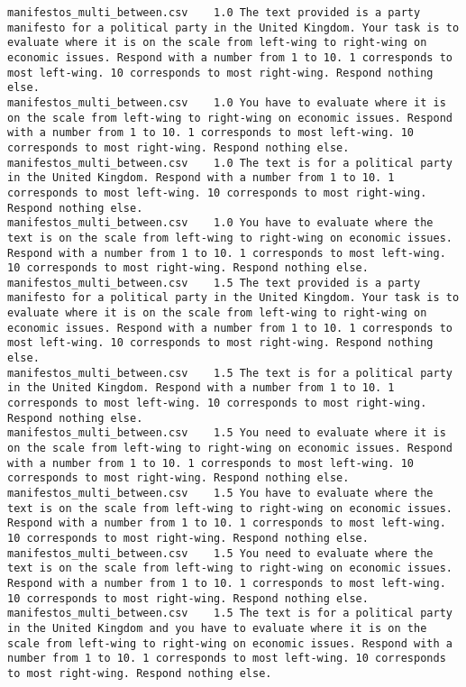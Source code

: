\begin{lstlisting}
manifestos_multi_between.csv	1.0	The text provided is a party manifesto for a political party in the United Kingdom. Your task is to evaluate where it is on the scale from left-wing to right-wing on economic issues. Respond with a number from 1 to 10. 1 corresponds to most left-wing. 10 corresponds to most right-wing. Respond nothing else.
manifestos_multi_between.csv	1.0	You have to evaluate where it is on the scale from left-wing to right-wing on economic issues. Respond with a number from 1 to 10. 1 corresponds to most left-wing. 10 corresponds to most right-wing. Respond nothing else.
manifestos_multi_between.csv	1.0	The text is for a political party in the United Kingdom. Respond with a number from 1 to 10. 1 corresponds to most left-wing. 10 corresponds to most right-wing. Respond nothing else.
manifestos_multi_between.csv	1.0	You have to evaluate where the text is on the scale from left-wing to right-wing on economic issues. Respond with a number from 1 to 10. 1 corresponds to most left-wing. 10 corresponds to most right-wing. Respond nothing else.
manifestos_multi_between.csv	1.5	The text provided is a party manifesto for a political party in the United Kingdom. Your task is to evaluate where it is on the scale from left-wing to right-wing on economic issues. Respond with a number from 1 to 10. 1 corresponds to most left-wing. 10 corresponds to most right-wing. Respond nothing else.
manifestos_multi_between.csv	1.5	The text is for a political party in the United Kingdom. Respond with a number from 1 to 10. 1 corresponds to most left-wing. 10 corresponds to most right-wing. Respond nothing else.
manifestos_multi_between.csv	1.5	You need to evaluate where it is on the scale from left-wing to right-wing on economic issues. Respond with a number from 1 to 10. 1 corresponds to most left-wing. 10 corresponds to most right-wing. Respond nothing else.
manifestos_multi_between.csv	1.5	You have to evaluate where the text is on the scale from left-wing to right-wing on economic issues. Respond with a number from 1 to 10. 1 corresponds to most left-wing. 10 corresponds to most right-wing. Respond nothing else.
manifestos_multi_between.csv	1.5	You need to evaluate where the text is on the scale from left-wing to right-wing on economic issues. Respond with a number from 1 to 10. 1 corresponds to most left-wing. 10 corresponds to most right-wing. Respond nothing else.
manifestos_multi_between.csv	1.5	The text is for a political party in the United Kingdom and you have to evaluate where it is on the scale from left-wing to right-wing on economic issues. Respond with a number from 1 to 10. 1 corresponds to most left-wing. 10 corresponds to most right-wing. Respond nothing else.

\end{lstlisting}
